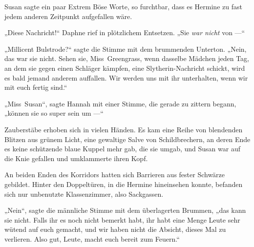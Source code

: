 Susan sagte ein paar Extrem Böse Worte, so furchtbar, dass es Hermine zu fast jedem anderen Zeitpunkt aufgefallen wäre.

„Diese Nachricht!“ Daphne rief in plötzlichem Entsetzen.
„Sie \emph{war nicht} von —“

„Millicent Bulstrode?“ sagte die Stimme mit dem brummenden Unterton.
„Nein, das war sie nicht. Sehen sie, Miss~Greengrass, wenn dasselbe Mädchen jeden Tag, an dem sie gegen einen Schläger kämpfen, eine Slytherin-Nachricht schickt, wird es bald jemand anderem auffallen. Wir werden uns mit ihr unterhalten, wenn wir mit euch fertig sind.“

„Miss~Susan“, sagte Hannah mit einer Stimme, die gerade zu zittern begann, „können sie so super sein um —“

Zauberstäbe erhoben sich in vielen Händen. Es kam eine Reihe von blendenden Blitzen aus grünem Licht, eine gewaltige Salve von Schildbrechern, an deren Ende es keine schützende blaue Kuppel mehr gab, die sie umgab, und Susan war auf die Knie gefallen und umklammerte ihren Kopf.

An beiden Enden des Korridors hatten sich Barrieren aus fester Schwärze gebildet. Hinter den Doppeltüren, in die Hermine hineinsehen konnte, befanden sich nur unbenutzte Klassenzimmer, also Sackgassen.

„Nein“, sagte die männliche Stimme mit dem überlagerten Brummen, „das kann sie nicht. Falls ihr es noch nicht bemerkt habt, ihr habt eine Menge Leute sehr wütend auf euch gemacht, und wir haben nicht die Absicht, dieses Mal zu verlieren. Also gut, Leute, macht euch bereit zum Feuern.“

